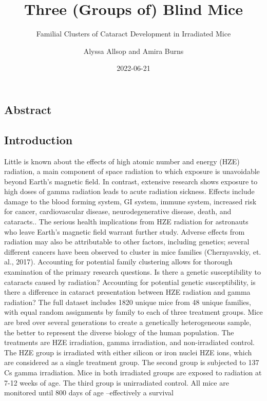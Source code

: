 \documentclass[
]{article}
\title{Three (Groups of) Blind Mice}
\subtitle{Familial Clusters of Cataract Development in Irradiated Mice}
\author{Alyssa Allsop and Amira Burns}
\date{2022-06-21}
\begin{document}
\maketitle

\hypertarget{abstract}{%
\subsection{Abstract}\label{abstract}}

\hypertarget{introduction}{%
\subsection{Introduction}\label{introduction}}

Little is known about the effects of high atomic number and energy (HZE)
radiation, a main component of space radiation to which exposure is
unavoidable beyond Earth's magnetic field. In contrast, extensive
research shows exposure to high doses of gamma radiation leads to acute
radiation sickness. Effects include damage to the blood forming system,
GI system, immune system, increased risk for cancer, cardiovascular
disease, neurodegenerative disease, death, and cataracts.. The serious
health implications from HZE radiation for astronauts who leave Earth's
magnetic field warrant further study. Adverse effects from radiation may
also be attributable to other factors, including genetics; several
different cancers have been observed to cluster in mice families
(Chernyavskiy, et. al., 2017). Accounting for potential family
clustering allows for thorough examination of the primary research
questions. Is there a genetic susceptibility to cataracts caused by
radiation? Accounting for potential genetic susceptibility, is there a
difference in cataract presentation between HZE radiation and gamma
radiation? The full dataset includes 1820 unique mice from 48 unique
families, with equal random assignments by family to each of three
treatment groups. Mice are bred over several generations to create a
genetically heterogeneous sample, the better to represent the diverse
biology of the human population. The treatments are HZE irradiation,
gamma irradiation, and non-irradiated control. The HZE group is
irradiated with either silicon or iron nuclei HZE ions, which are
considered as a single treatment group. The second group is subjected to
137 Cs gamma irradiation. Mice in both irradiated groups are exposed to
radiation at 7-12 weeks of age. The third group is unirradiated control.
All mice are monitored until 800 days of age --effectively a survival
\end{document}
